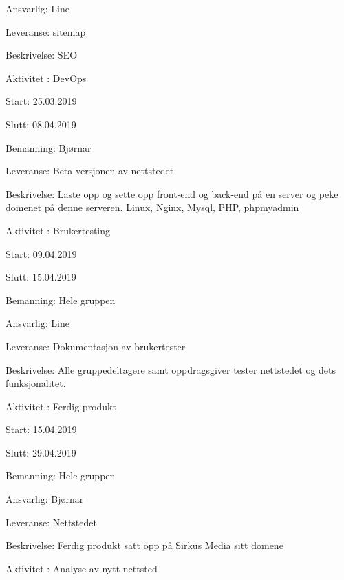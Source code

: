 \documentclass[11pt,a4paper]{report}
\begin{document}
\begin{compactdesc}
\begin{compactitem}
	\item Ansvarlig: Line
	\item Leveranse: sitemap
	\item Beskrivelse: SEO
	\addtocounter{aktivitetTeller}{1}
	\end{compactitem}
	\item [Aktivitet \arabic{aktivitetTeller}:] DevOps
	\begin{compactitem}
	\item Start: 25.03.2019
	\item Slutt: 08.04.2019
	\item Bemanning: Bjørnar
	\item Leveranse: Beta versjonen av nettstedet
	\item Beskrivelse: Laste opp og sette opp front-end og back-end på en server og peke domenet på denne serveren. Linux, Nginx, Mysql, PHP, phpmyadmin
	\addtocounter{aktivitetTeller}{1}
	\end{compactitem}
	\item [Aktivitet \arabic{aktivitetTeller}:] Brukertesting
	\begin{compactitem}
	\item Start: 09.04.2019
	\item Slutt: 15.04.2019
	\item Bemanning: Hele gruppen
	\item Ansvarlig: Line
	\item Leveranse: Dokumentasjon av brukertester
	\item Beskrivelse: Alle gruppedeltagere samt oppdragsgiver tester nettstedet og dets funksjonalitet.
	\addtocounter{aktivitetTeller}{1}
	\end{compactitem}
	\item [Aktivitet \arabic{aktivitetTeller}:] Ferdig produkt
	\begin{compactitem}
	\item Start: 15.04.2019
	\item Slutt: 29.04.2019
	\item Bemanning: Hele gruppen
	\item Ansvarlig: Bjørnar
	\item Leveranse: Nettstedet
	\item Beskrivelse: Ferdig produkt satt opp på Sirkus Media sitt domene
	\addtocounter{aktivitetTeller}{1}
	\end{compactitem}
	\item [Aktivitet \arabic{aktivitetTeller}:] Analyse av nytt nettsted
	\begin{compactitem}

\end{compactitem}
\end{compactdesc}
\end{document}
